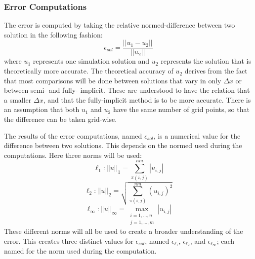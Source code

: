 \subsubsection{Error Computations}

  The error is computed by taking the relative normed-difference between two solution in the following fashion:
  \begin{equation} \label{equ:error_comp}
    \epsilon_{sol} = \frac{||u_1 - u_2||}{||u_2||}
  \end{equation}
  where $u_1$ represents one simulation solution and $u_2$ represents the solution that is theoretically more accurate.
  The theoretical accuracy of $u_2$ derives from the fact that most comparisons will be done between solutions that vary in only $\Delta x$ or between semi- and fully- implicit.
  These are understood to have the relation that a smaller $\Delta x$, and that the fully-implicit method is to be more accurate.
  There is an assumption that both $u_1$ and $u_2$ have the same number of grid points, so that the difference can be taken grid-wise.


  The results of the error computations, named $\epsilon_{sol}$, is a numerical value for the difference between two solutions.
  This depends on the normed used during the computations.
  Here three norms will be used:
  \begin{equation}  \label{equ:norm_l1}
    \ell_1: ||u||_1 = \sum_{\pi(i,j)}^{nm} |u_{i,j}|
  \end{equation}
  \begin{equation}  \label{equ:norm_l2}
    \ell_2: ||u||_2 = \sqrt{\sum_{\pi(i,j)}^{nm} (u_{i,j})^2}
  \end{equation}
  \begin{equation}  \label{equ:norm_linf}
    \ell_\infty: ||u||_\infty = \max_{\substack{i=1,\ldots,n \\j=1,\ldots,m}} |u_{i,j}|
  \end{equation}
  These different norms will all be used to create a broader understanding of the error.
  This creates three distinct values for $\epsilon_{sol}$, named $\epsilon_{\ell_1}$, $\epsilon_{\ell_2}$, and $\epsilon_{\ell_\infty}$; each named for the norm used during the computation.
  
